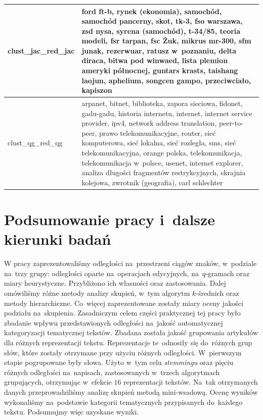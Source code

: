 \documentclass{praca1}
\begin{document}
\begin{longtable}{|L{0.5cm}|L{15cm}|}
   \hline
\begin{sideways}clust\_jac\_red\_jac\end{sideways} & ford ft-b, rynek (ekonomia), samochód, samochód pancerny, skot, tk-3, fso warszawa, zsd nysa, syrena (samochód), t-34/85, teoria modeli, fsr tarpan, fsc Żuk, mikrus mr-300, sfm junak, rezerwuar, ratusz w~poznaniu, delta diraca, bitwa pod winwaed, lista plemion ameryki północnej, guntars krasts, taishang laojun, aphelium, songcen gampo, przeciwciało, kapiszon \\ %
   \hline
\begin{sideways}clust\_qg\_red\_qg\end{sideways} & arpanet, bitnet, biblioteka, zapora sieciowa, fidonet, gadu-gadu, historia internetu, internet, internet service provider, ipv4, network address translation, peer-to-peer, prawo telekomunikacyjne, router, sieć komputerowa, sieć lokalna, sieć rozległa, sms, sieć telekomunikacyjna, orange polska, telekomunikacja, telekomunikacja w~polsce, usenet, internet explorer, analiza długości fragmentów restrykcyjnych, skrajnia kolejowa, zwrotnik (geografia), carl schlechter \\ %
   \hline
\end{longtable}
\restoregeometry
\chapter{Podsumowanie pracy i~dalsze kierunki badań}

W pracy zaprezentowaliśmy odległości na~przestrzeni ciągów znaków, w~podziale na~trzy grupy: odległości oparte na~operacjach edycyjnych, na~$q$-gramach oraz miary heurystyczne. Przybliżono ich własności oraz zastosowania. Dalej omówiliśmy różne metody analizy skupień, w~tym algorytm $k$-średnich oraz metody hierarchiczne. Co~więcej zaprezentowane zostały miary oceny jakości podziału na~skupienia. Zasadniczym celem części praktycznej tej pracy było zbadanie wpływu przedstawionych odległości na~jakość automatycznej kategoryzacji tematycznej tekstów. Zbadana została jakość grupowania artykułów dla różnych reprezentacji tekstu. Reprezentacje te~odnosiły się do~różnych grup słów, które zostały otrzymane przy użyciu różnych odległości. W~pierwszym etapie pogrupowane były słowa. Użyto w~tym celu \emph{stemmingu} oraz pięciu różnych odległości na~napisach, zastosowanych w~trzech algorytmach grupujących, otrzymując w~efekcie $16$ reprezentacji tekstów. Na~tak otrzymanych danych przeprowadziliśmy analizę skupień metodą mini-wsadową. Ocenę wyników wykonaliśmy na~podstawie kategorii tematycznych przypisanych do~każdego tekstu. Podsumujmy więc uzyskane wyniki.
\end{document}
